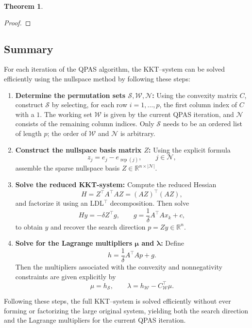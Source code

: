\documentclass{book}
\theoremstyle{definition}
\newtheorem{theorem}{Theorem}[section]
\newcounter{algorithm_}
\numberwithin{algorithm_}{chapter}
\begin{document}
{\begin{theorem}
\begin{proof}
\end{proof}
\end{theorem}


\subsection{Summary}

For each iteration of the QPAS algorithm, the KKT--system can be solved efficiently using the nullspace method by following these steps:

\begin{enumerate}
    \item \textbf{Determine the permutation sets \(\mathbf{\mathcal{S}}, \mathbf{\mathcal{W}}, \mathbf{\mathcal{N}}\):}  
    Using the convexity matrix \(C\), construct \(\mathcal{S}\) by selecting, for each row \(i = 1, \dots, p\), the first column index of \(C\) with a \(1\).  
    The working set \(\mathcal{W}\) is given by the current QPAS iteration, and \(\mathcal{N}\) consists of the remaining column indices.  
    Only \(\mathcal{S}\) needs to be an ordered list of length \(p\); the order of \(\mathcal{W}\) and \(\mathcal{N}\) is arbitrary.
    
    \item \textbf{Construct the nullspace basis matrix \(Z\):}  
    Using the explicit formula
    \[
    z_j = e_j - e_{\operatorname{rep}(j)}, \qquad j \in \mathcal{N},
    \]
    assemble the sparse nullspace basis \(Z \in \mathbb{R}^{n \times |\mathcal{N}|}\).  
    
    \item \textbf{Solve the reduced KKT-system:}  
    Compute the reduced Hessian
    \[
    H = Z^\top A^\top A Z = (A Z)^\top (A Z),
    \]
    and factorize it using an LDL\(^\top\) decomposition. Then solve
    \[
    H y = -\delta Z^\top g, \qquad g = \frac{1}{\delta} A^\top A x_k + c,
    \]
    to obtain \(y\) and recover the search direction $p = Z y \in \mathbb{R}^n$.
    
    \item \textbf{Solve for the Lagrange multipliers \( \mathbf{\mu} \) and \( \mathbf{\lambda} \):}  
    Define
    \[
    h = \frac{1}{\delta} A^\top A p + g.
    \]
    Then the multipliers associated with the convexity and nonnegativity constraints are given explicitly by
    \[
    \mu = h_\mathcal{S}, \qquad \lambda = h_\mathcal{W} - C_\mathcal{W}^\top \mu.
    \]
\end{enumerate}

Following these steps, the full KKT--system is solved efficiently without ever forming or factorizing the large original system, yielding both the search direction and the Lagrange multipliers for the current QPAS iteration.



}
\end{document}
